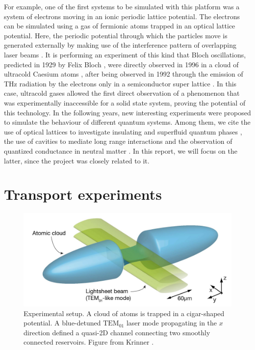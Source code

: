 For example, one of the first systems to be simulated with this platform was a system of electrons moving in an ionic periodic lattice potential.  The electrons can be simulated using a gas of fermionic atoms trapped in an optical lattice potential. Here, the periodic potential
through which the particles move is generated externally by making
use of the interference pattern of overlapping laser beams \cite{bloch2008}. It is performing an experiment of this kind that Bloch oscillations, predicted in 1929 by Felix Bloch \cite{bloch1929a}, were directly observed in 1996 in a cloud of ultracold Caesium atoms \cite{dahan1996}, after being observed in 1992 through the emission of THz radiation by the electrons only in a semiconductor super lattice \cite{feldmann1992}. In this case, ultracold gases allowed the first direct observation of a phenomenon that was experimentally inaccessible for a solid state system, proving the potential of this technology. In the following years, new interesting experiments were proposed to simulate the behaviour of different quantum systems. Among them, we cite the use of optical lattices to investigate insulating and superfluid quantum phases \cite{greiner2002}, the use of cavities to mediate long range interactions \cite{landig2016} and the observation of quantized conductance in neutral matter \cite{krinner2015}. In this report, we will focus on the latter, since the project was closely related to it.

\section{Transport experiments}
\begin{figure}
    \includegraphics[width=\textwidth]{chapters/chapter_1/figures/reservoir.png}
    \caption{Experimental setup. A cloud of atoms is trapped in a cigar-shaped potential. A blue-detuned $\text{TEM}_{01}$ laser mode propagating in the $x$ direction defined a quasi-2D channel connecting two smoothly connected reservoirs. Figure from Krinner \cite{krinner2015b}.}
    \label{fig:lithium_apparatus}
\end{figure}

